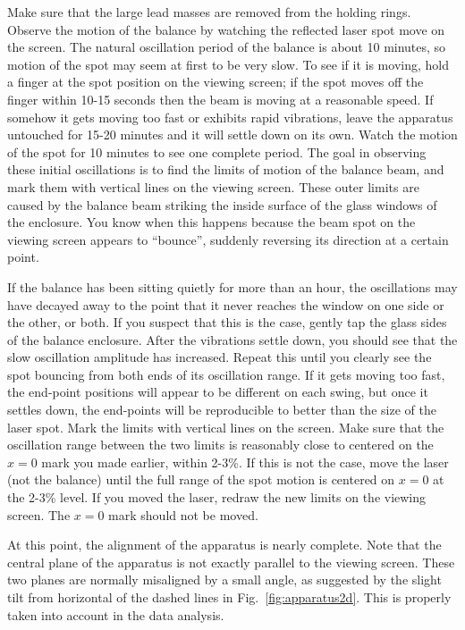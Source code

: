 \documentclass{revtex4}
\begin{document}
Make sure that the large lead masses are removed from the holding rings.
Observe the motion of the balance by watching the reflected laser spot
move on the screen.  The natural oscillation period of the balance is
about 10 minutes, so motion of the spot may seem at first to be very slow.
To see if it is moving, hold a finger at the spot position on the viewing
screen; if the spot moves off the finger within 10-15 seconds then the
beam is moving at a reasonable speed.  If somehow it gets moving too fast
or exhibits rapid vibrations, leave the apparatus untouched for 15-20 minutes
and it will settle down on its own.  Watch the motion of the spot for 10
minutes to see one complete period.  The goal in observing these initial
oscillations is to find the limits of motion of the balance beam, and mark
them with vertical lines on the viewing screen.  These outer limits are
caused by the balance beam striking the inside surface of the glass windows
of the enclosure.  You know when this happens because the beam spot on the
viewing screen appears to ``bounce'', suddenly reversing its direction at
a certain point.

If the balance has been sitting quietly for more than an
hour, the oscillations may have decayed away to the point that it never 
reaches the window on one side or the other, or both.  If you
suspect that this is the case, gently tap the glass sides of the balance
enclosure.  After the vibrations settle down, you should see that the slow
oscillation amplitude has increased.  Repeat this until you clearly see the
spot bouncing from both ends of its oscillation range.  If it gets moving too
fast, the end-point positions will appear to be different on each swing, but
once it settles down, the end-points will be reproducible to better than the
size of the laser spot.  Mark the limits with vertical lines on the screen.
Make sure that the oscillation range between the two limits is reasonably
close to centered on the $x=0$ mark you made earlier, within 2-3\%.  If
this is not the case, move the laser (not the balance) until the full range
of the spot motion is centered on $x=0$ at the 2-3\% level.  If you moved
the laser, redraw the new limits on the viewing screen.  The $x=0$ mark
should not be moved.

At this point, the alignment of the apparatus is nearly complete.  Note
that the central plane of the apparatus is not exactly parallel to the
viewing screen.  These two planes are normally misaligned by a small angle,
as suggested by the slight tilt from horizontal of the dashed lines in 
Fig.~\ref{fig:apparatus2d}.  This is properly taken into account in the data
analysis.
\end{document}
